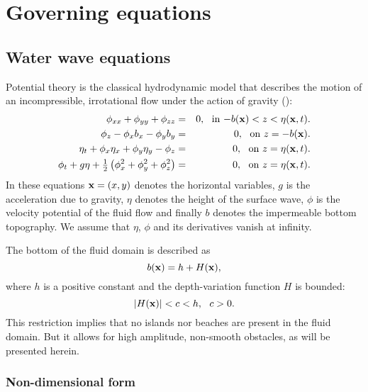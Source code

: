 \section{Governing equations}


\subsection{Water wave equations}
Potential theory is the classical hydrodynamic model that describes the motion of an incompressible, irrotational flow under the action of gravity (\cite{Whitham}):
\begin{eqnarray}
	\phi_{xx}+\phi_{yy}+\phi_{zz}&=& 0,\ \ \text{in $-b(\x)<z<\eta(\x,t)$.}\label{S1:Eq01}\\
	\phi_{z} - \phi_{x}b_x - \phi_{y}b_y &=& 0,\ \ \text{on $z=-b(\x)$.}\label{S1:Eq02}\\
	\eta_t + \phi_x\eta_x + \phi_y\eta_y - \phi_z&=& 0 ,\ \ \text{on $z=\eta(\x,t)$.}\label{S1:Eq03}\\
	\phi_t + g\eta +\tfrac{1}{2}\left(\phi_x^2+\phi_y^2+\phi_z^2\right) &=& 0,\ \ \text{on $z=\eta(\x,t)$.}\label{S1:Eq04}
\end{eqnarray}
In these equations $\bold{x} = (x,y)$ denotes the horizontal variables, $g$ is the acceleration due to gravity, $\eta$ denotes the height of the surface wave, $\phi$ is the velocity potential of the fluid flow and finally $b$ denotes the 
impermeable bottom topography. We assume that $\eta$, $\phi$ and its derivatives vanish at infinity.

The bottom of the fluid domain is described as
\begin{equation}\label{S1:Eq05}
b(\bold{x}) = h + H(\bold{x}),
\end{equation}
where $h$ is a positive constant and the depth-variation function $H$ is bounded: 
\begin{equation}\label{S1:Eq06}
|H(\bold{x})|<c<h, ~~c > 0.
\end{equation} 
This restriction implies that no islands nor beaches are present in the fluid domain. But it allows for high amplitude, non-smooth obstacles, as will be presented herein.

\subsubsection{Non-dimensional form}

